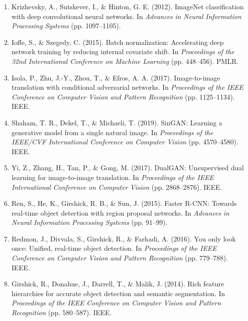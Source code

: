 \documentclass[12pt]{report}
\begin{document}
\begin{enumerate}
    \item Krizhevsky, A., Sutskever, I., \& Hinton, G. E. (2012). ImageNet classification with deep convolutional neural networks. In \textit{Advances in Neural Information Processing Systems} (pp. 1097–1105).
    
    \item Ioffe, S., \& Szegedy, C. (2015). Batch normalization: Accelerating deep network training by reducing internal covariate shift. In \textit{Proceedings of the 32nd International Conference on Machine Learning} (pp. 448–456). PMLR.
    
    \item Isola, P., Zhu, J.-Y., Zhou, T., \& Efros, A. A. (2017). Image-to-image translation with conditional adversarial networks. In \textit{Proceedings of the IEEE Conference on Computer Vision and Pattern Recognition} (pp. 1125–1134). IEEE.
    
    \item Shaham, T. R., Dekel, T., \& Michaeli, T. (2019). SinGAN: Learning a generative model from a single natural image. In \textit{Proceedings of the IEEE/CVF International Conference on Computer Vision} (pp. 4570–4580). IEEE.
    
    \item Yi, Z., Zhang, H., Tan, P., \& Gong, M. (2017). DualGAN: Unsupervised dual learning for image-to-image translation. In \textit{Proceedings of the IEEE International Conference on Computer Vision} (pp. 2868–2876). IEEE.
    
    \item Ren, S., He, K., Girshick, R. B., \& Sun, J. (2015). Faster R-CNN: Towards real-time object detection with region proposal networks. In \textit{Advances in Neural Information Processing Systems} (pp. 91–99).
    
    \item Redmon, J., Divvala, S., Girshick, R., \& Farhadi, A. (2016). You only look once: Unified, real-time object detection. In \textit{Proceedings of the IEEE Conference on Computer Vision and Pattern Recognition} (pp. 779–788). IEEE.
    
    \item Girshick, R., Donahue, J., Darrell, T., \& Malik, J. (2014). Rich feature hierarchies for accurate object detection and semantic segmentation. In \textit{Proceedings of the IEEE Conference on Computer Vision and Pattern Recognition} (pp. 580–587). IEEE.
    

\end{enumerate}
\end{document}
